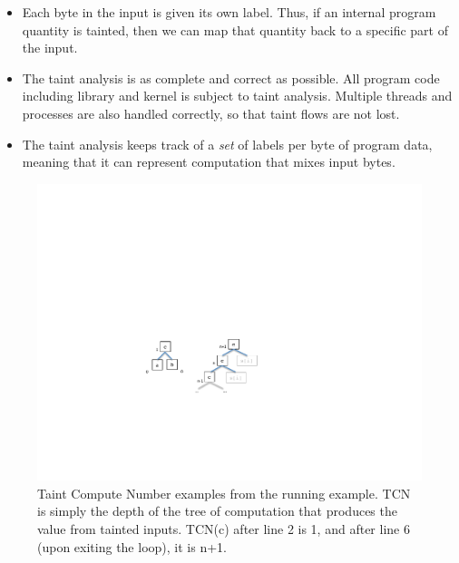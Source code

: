 \begin{itemize}
\item Each byte in the input is given its own label.
Thus, if an internal program quantity is tainted, then we can map that quantity back to a specific part of the input.
\item The taint analysis is as complete and correct as possible.  
All program code including library and kernel is subject to taint analysis.
Multiple threads and processes are also handled correctly, so that taint flows are not lost.
\item The taint analysis keeps track of a \emph{set} of labels per byte of program data, meaning that it can represent computation that mixes input bytes.
\end{itemize}

\begin{figure}
\centering
\includegraphics[scale=0]{tcn.pdf}
\caption{Taint Compute Number examples from the running example.  
TCN is simply the depth of the tree of computation that produces the value from tainted inputs.
TCN(c) after line 2 is 1, and after line 6 (upon exiting the loop), it is n+1.}
\label{fig:taint-compute-number}
\end{figure}

